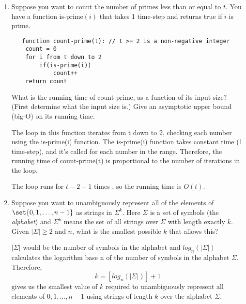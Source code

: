 \documentclass[11pt]{exam}
\begin{document}
\begin{enumerate}
\begin{enumerate}
	\end{enumerate}
   
   \item Suppose you want to count the number of primes less than or equal to $t$.
   You have a function $\text{is-prime}(i)$ that takes 1 time-step and returns true if $i$ is prime.
   \begin{lstlisting}
   function count-prime(t): // t >= 2 is a non-negative integer
    count = 0
    for i from t down to 2
   	    if(is-prime(i))
            count++
    return count
   \end{lstlisting} 

    What is the running time of count-prime, as a function of its input size? (First determine what the input size is.)  Give an asymptotic upper bound (big-O) on its running time.  
      
    \begin{solution}
The loop in this function iterates from t down to 2, checking each number using the is-prime(i) function. The is-prime(i) function takes constant time (1 time-step), and it's called for each number in the range. Therefore, the running time of count-prime(t) is proportional to the number of iterations in the loop.

The loop runs for $t - 2 + 1$ times , so the running time is $O(t)$.
    \end{solution}

  \item Suppose you want to unambiguously represent all of the elements of $\set{0, 1, \ldots, n-1}$ as strings in $\Sigma^k$.  Here $\Sigma$ is a set of symbols (the \emph{alphabet})
  and $\Sigma^k$ means the set of all strings over $\Sigma$ with length exactly $k$.
    Given $|\Sigma|\geq 2$ and $n$, what is the smallest possible $k$ that allows this?
    
    \begin{solution}
$|\Sigma|$ would be the number of symbols in the alphabet and $log_n(|\Sigma|)$ calculates the logarithm base n of the number of symbols in the alphabet $\Sigma$. 
Therefore, 
\[
k = [log_n(|\Sigma|)] + 1 
\]
gives us the smallest value of $k$ required to unambiguously represent all elements of ${0, 1, ..., n-1}$ using strings of length $k$ over the alphabet $\Sigma$.
    
    \end{solution}

\end{enumerate}
\end{document}
